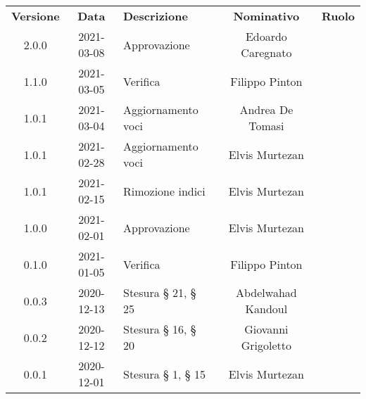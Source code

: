{
    \renewcommand{\arraystretch}{1.5}
    \centering
    \begin{longtable}{ c c  C{4cm}  c  c }
        \rowcolor{\primaryColor}
        \textcolor{\secondaryColor}{
        \textbf{Versione}}     & \textcolor{\secondaryColor}{\textbf{Data}}       & \textcolor{\secondaryColor}
        {\textbf{Descrizione}} & \textcolor{\secondaryColor}{\textbf{Nominativo}} & \textcolor{\secondaryColor}{\textbf{Ruolo}}                          \\


        2.0.0                  & 2021-03-08                                       & Approvazione     & Edoardo Caregnato & \responsabile{} \\
        1.1.0                  & 2021-03-05                                       & Verifica     & Filippo Pinton & \verificatore{} \\
        1.0.1                  & 2021-03-04                                       & Aggiornamento voci     & Andrea De Tomasi & \redattore{} \\
        1.0.1                  & 2021-02-28                                       & Aggiornamento voci     & Elvis Murtezan & \redattore{} \\
        1.0.1                  & 2021-02-15                                       & Rimozione indici             & Elvis Murtezan & \redattore{} \\
        1.0.0                  & 2021-02-01                                       & Approvazione              & Elvis Murtezan& \responsabile{} \\
        0.1.0                  & 2021-01-05                                       & Verifica             & Filippo Pinton & \verificatore{} \\
        0.0.3                  & 2020-12-13                                       & Stesura § 21, § 25              & Abdelwahad Kandoul & \redattore{} \\
        0.0.2                  & 2020-12-12                                       & Stesura § 16, § 20              & Giovanni Grigoletto & \redattore{} \\
        0.0.1                  & 2020-12-01                                       & Stesura § 1, § 15              & Elvis Murtezan & \redattore{} \\
    \end{longtable}
}